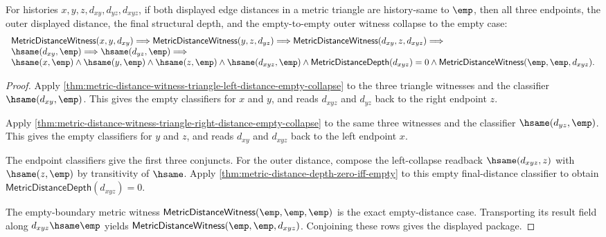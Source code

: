 \begin{theorem}
\label{thm:metric-distance-witness-triangle-bilateral-empty-edge-collapse}
For histories $x,y,z,d_{xy},d_{yz},d_{xyz}$, if both displayed edge distances
in a metric triangle are history-same to $\emp$, then all three endpoints, the
outer displayed distance, the final structural depth, and the empty-to-empty
outer witness collapse to the empty case:
$$
\begin{array}{l}
\mathsf{MetricDistanceWitness}(x,y,d_{xy})\Longrightarrow
\mathsf{MetricDistanceWitness}(y,z,d_{yz})\Longrightarrow
\mathsf{MetricDistanceWitness}(d_{xy},z,d_{xyz})\Longrightarrow\\
\hsame(d_{xy},\emp)\Longrightarrow
\hsame(d_{yz},\emp)\Longrightarrow\\
\hsame(x,\emp)\land\hsame(y,\emp)\land\hsame(z,\emp)\land
\hsame(d_{xyz},\emp)\land
\mathsf{MetricDistanceDepth}(d_{xyz})=0\land
\mathsf{MetricDistanceWitness}(\emp,\emp,d_{xyz}).
\end{array}
$$
\end{theorem}
\begin{proof}
Apply
\autoref{thm:metric-distance-witness-triangle-left-distance-empty-collapse} to
the three triangle witnesses and the classifier $\hsame(d_{xy},\emp)$. This
gives the empty classifiers for $x$ and $y$, and reads $d_{xyz}$ and
$d_{yz}$ back to the right endpoint $z$.

Apply
\autoref{thm:metric-distance-witness-triangle-right-distance-empty-collapse} to
the same three witnesses and the classifier $\hsame(d_{yz},\emp)$. This gives
the empty classifiers for $y$ and $z$, and reads $d_{xy}$ and $d_{xyz}$ back to
the left endpoint $x$.

The endpoint classifiers give the first three conjuncts. For the outer
distance, compose the left-collapse readback $\hsame(d_{xyz},z)$ with
$\hsame(z,\emp)$ by transitivity of $\hsame$. Apply
\autoref{thm:metric-distance-depth-zero-iff-empty} to this empty final-distance
classifier to obtain $\mathsf{MetricDistanceDepth}(d_{xyz})=0$.

The empty-boundary metric witness
$\mathsf{MetricDistanceWitness}(\emp,\emp,\emp)$ is the exact empty-distance
case. Transporting its result field along $d_{xyz}\hsame\emp$ yields
$\mathsf{MetricDistanceWitness}(\emp,\emp,d_{xyz})$. Conjoining these rows
gives the displayed package.
\end{proof}

